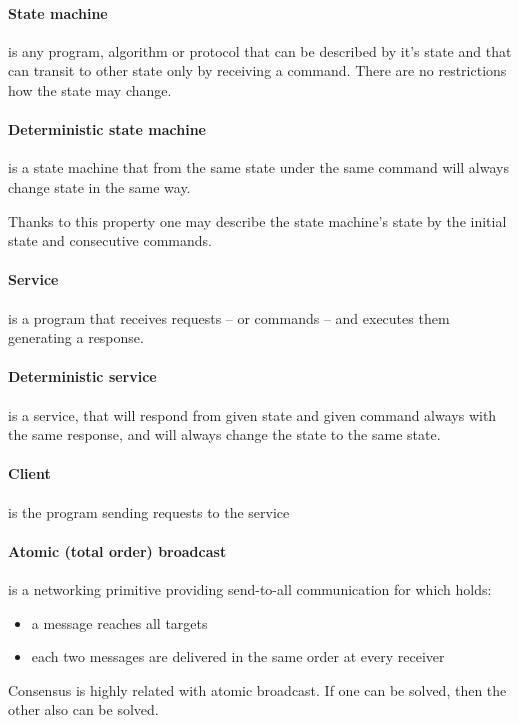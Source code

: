 \paragraph{State machine}
is any program, algorithm or protocol that can be described by it's state and that can transit to other state only by receiving a command.
There are no restrictions how the state may change.

\paragraph{Deterministic state machine}
is a state machine that from the same state under the same command will always change state in the same way.

Thanks to this property one may describe the state machine's state by the initial state and consecutive commands. 

\paragraph{Service}
is a program that receives requests -- or commands -- and executes them generating a response.

\paragraph{Deterministic service}
is a service, that will respond from given state and given command always with the same response, and will always change the state to the same state.

\paragraph{Client}
is the program sending requests to the service

\paragraph{Atomic (total order) broadcast}
is a networking primitive providing send-to-all communication for which holds:
\begin{itemize}
 \item a message reaches all targets
 \item each two messages are delivered in the same order at every receiver
\end{itemize}

Consensus is highly related with atomic broadcast. If one can be solved, then the other also can be solved.

